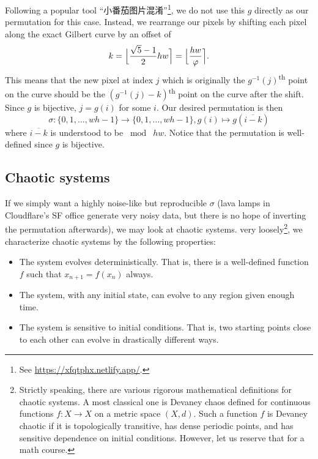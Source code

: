 \documentclass[12pt, a4paper, twoside]{article}
\begin{document}
Following a popular tool ``小番茄图片混淆''\footnote{See \url{https://xfqtphx.netlify.app/}.}, we do not use this $g$ directly as our permutation for this case. Instead, we rearrange our pixels by shifting each pixel along the exact Gilbert curve by an offset of
\begin{equation}
    k = \Bigl\lfloor \frac{\sqrt{5} - 1}{2} h w \Bigr\rceil = \Bigl\lfloor \frac{h w}{\varphi} \Bigr\rceil.
\end{equation}
This means that the new pixel at index $j$ which is originally the $g^{-1}(j)$\textsuperscript{th} point on the curve should be the $(g^{-1}(j) - k)$\textsuperscript{th} point on the curve after the shift. Since $g$ is bijective, $j = g(i)$ for some $i$. Our desired permutation is then
\begin{equation}
    \sigma\colon \{0, 1, \ldots, w h - 1\} \to \{0, 1, \ldots, w h - 1\}, g(i) \mapsto g(\overline{i - k})
\end{equation}
where $\overline{i - k}$ is understood to be $\bmod \; h w$. Notice that the permutation is well-defined since $g$ is bijective.

\subsection{Chaotic systems}

If we simply want a highly noise-like but reproducible $\sigma$ (lava lamps in Cloudflare's SF office generate very noisy data, but there is no hope of inverting the permutation afterwards), we may look at chaotic systems. very loosely\footnote{Strictly speaking, there are various rigorous mathematical definitions for chaotic systems. A most classical one is Devaney chaos defined for continuous functions $f\colon X \to X$ on a metric space $(X, d)$. Such a function $f$ is Devaney chaotic if it is topologically transitive, has dense periodic points, and has sensitive dependence on initial conditions. However, let us reserve that for a math course.}, we characterize chaotic systems by the following properties:
\begin{itemize}
    \item The system evolves deterministically. That is, there is a well-defined function $f$ such that $x_{n + 1} = f(x_n)$ always.
    \item The system, with any initial state, can evolve to any region given enough time.
    \item The system is sensitive to initial conditions. That is, two starting points close to each other can evolve in drastically different ways.
\end{itemize}
\end{document}
